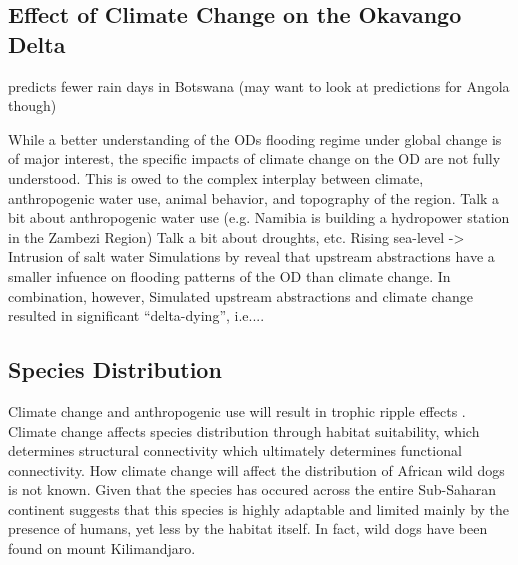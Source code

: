 \documentclass[abstract=on,10pt,a4paper,bibliography=totocnumbered]{article}
\begin{document}
\subsection{Effect of Climate Change on the Okavango Delta}
\cite{Akinyemi.2019} predicts fewer rain days in Botswana (may want to look at
predictions for Angola though)

While a better understanding of the ODs flooding regime under global change is
of major interest, the specific impacts of climate change on the OD are not
fully understood. This is owed to the complex interplay between climate,
anthropogenic water use, animal behavior, and topography of the region. Talk a
bit about anthropogenic water use (e.g. Namibia is building a hydropower station
in the Zambezi Region) Talk a bit about droughts, etc. Rising sea-level ->
Intrusion of salt water Simulations by \cite{Wolski.2006} reveal that upstream
abstractions have a smaller infuence on flooding patterns of the OD than climate
change. In combination, however, Simulated upstream abstractions and climate
change resulted in significant ``delta-dying'', i.e....

\subsection{Species Distribution}
Climate change and anthropogenic use will result in trophic ripple effects
\citep{Wolski.2006}. Climate change affects species distribution through habitat
suitability, which determines structural connectivity which ultimately
determines functional connectivity. How climate change will affect the
distribution of African wild dogs is not known. Given that the species has
occured across the entire Sub-Saharan continent suggests that this species is
highly adaptable and limited mainly by the presence of humans, yet less by the
habitat itself. In fact, wild dogs have been found on mount Kilimandjaro.
\end{document}

